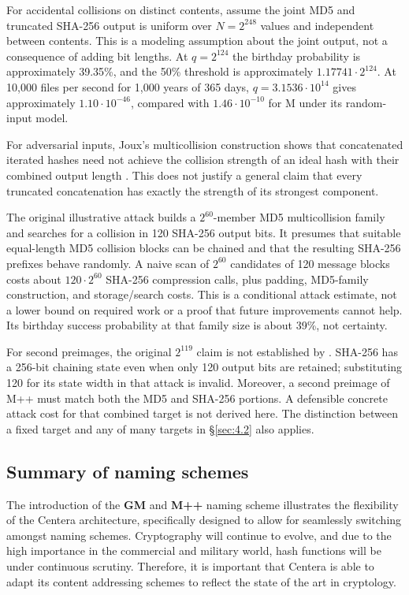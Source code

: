 For accidental collisions on distinct contents, assume the joint MD5 and
truncated SHA-256 output is uniform over $N=2^{248}$ values and independent
between contents. This is a modeling assumption about the joint output,
not a consequence of adding bit lengths. At $q=2^{124}$ the birthday
probability is approximately 39.35\%, and the 50\% threshold is approximately
$1.17741\cdot2^{124}$. At 10,000 files per second for 1,000 years of 365 days,
$q=3.1536\cdot10^{14}$ gives approximately $1.10\cdot10^{-46}$, compared
with $1.46\cdot10^{-10}$ for M under its random-input model.

For adversarial inputs, Joux's multicollision construction shows that
concatenated iterated hashes need not achieve the collision strength of an
ideal hash with their combined output length \cite{ref1}. This does not
justify a general claim that every truncated concatenation has exactly the
strength of its strongest component.

The original illustrative attack builds a $2^{60}$-member MD5 multicollision
family and searches for a collision in 120 SHA-256 output bits. It presumes
that suitable equal-length MD5 collision blocks can be chained and that the
resulting SHA-256 prefixes behave randomly. A naive scan of $2^{60}$
candidates of 120 message blocks costs about $120\cdot2^{60}$ SHA-256
compression calls, plus padding, MD5-family construction, and storage/search
costs. This is a conditional attack estimate, not a lower bound on required
work or a proof that future improvements cannot help. Its birthday success
probability at that family size is about 39\%, not certainty.

For second preimages, the original $2^{119}$ claim is not established by
\cite{ref11}. SHA-256 has a 256-bit chaining state even when only 120 output
bits are retained; substituting 120 for its state width in that attack is
invalid. Moreover, a second preimage of M++ must match both the MD5 and
SHA-256 portions. A defensible concrete attack cost for that combined target
is not derived here. The distinction between a fixed target and any of many
targets in \S\ref{sec:4.2} also applies.

\subsection{Summary of naming schemes}\label{sec:5.6}\label{summary-of-naming-schemes}

The introduction of the \textbf{GM} and \textbf{M++} naming scheme
illustrates the flexibility of the Centera architecture, specifically
designed to allow for seamlessly switching amongst naming schemes.
Cryptography will continue to evolve, and due to the high importance in
the commercial and military world, hash functions will be under
continuous scrutiny. Therefore, it is important that Centera is able to
adapt its content addressing schemes to reflect the state of the art in
cryptology.

